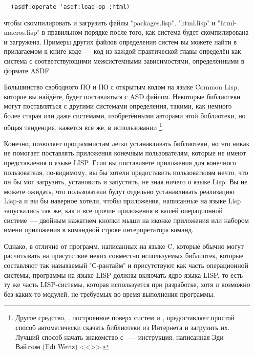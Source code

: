 \begin{lstlisting}
  (asdf:operate 'asdf:load-op :html)
\end{lstlisting}

чтобы скомпилировать и загрузить файлы "packages.lisp", "html.lisp" и "html-macros.lisp" в
правильном порядке после того, как система  будет скомпилирована и
загружена. Примеры других файлов определения систем  вы можете найти в
прилагаемом к книге коде~--- код из каждой практической главы определён как система с
соответствующими межсистемными зависимостями, определёнными в формате ASDF.

Большинство свободного ПО и ПО с открытым кодом на языке Common Lisp, которое вы найдёте,
будет поставляться с ASD файлом. Некоторые библиотеки могут поставляться с другими
системами определения, такими, как немного более старая  или даже
системами, изобретёнными авторами этой библиотеки, но общая тенденция, кажется все же, в
использовании \footnote{Другое средство, , построенное
  поверх систем  и , предоставляет простой способ
  автоматически скачать библиотеки из Интернета и загрузить их. Лучший способ начать
  знакомство с ~--- инструкция, написанная Эди Вайтзом (Edi Weitz)
  <<>>. }.

Конечно,  позволяет программистам легко устанавливать библиотеки, но это никак
не помогает поставлять приложения конечным пользователям, которые не имеют представления о
языке LISP. Если вы поставляете приложения для конечного пользователя, по-видимому, вы бы
хотели предоставить пользователям нечто, что он бы мог загрузить, установить и запустить,
не зная ничего о языке Lisp. Вы не можете ожидать, что пользователи будут отдельно
устанавливать реализацию Lisp-а и вы бы наверное хотели, чтобы приложения, написанные на
языке Lisp запускались так же, как и все прочие приложения в вашей операционной
системе~--- двойным нажатием кнопки мыши на иконке приложения или набором имени приложения
в командной строке интерпретатора команд.

Однако, в отличие от программ, написанных на языке C, которые обычно могут расчитывать на
присутствие неких совместно используемых библиотек, которые составляют так называемый
"С-рантайм" и присутствуют как часть операционной системы, программы на языке LISP должны
включать ядро языка LISP, то есть ту же часть LISP-системы, которая используется при
разработке, хотя и возможно без каких-то модулей, не требуемых во время выполнения
программы.

